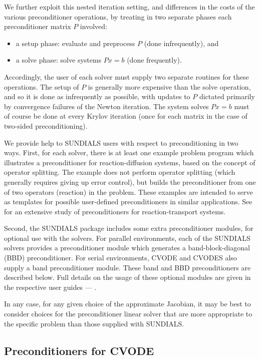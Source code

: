 We further exploit this nested iteration setting, and differences in
the costs of the various preconditioner operations, by treating in two
separate phases each preconditioner matrix $P$ involved:
\begin{itemize}
\item a setup phase: evaluate and preprocess $P$ (done infrequently), and
\item a solve phase: solve systems $Px = b$ (done frequently).
\end{itemize}
Accordingly, the user of each solver must supply two separate
routines for these operations.  The setup of $P$ is generally more
expensive than the solve operation, and so it is done as infrequently
as possible, with updates to $P$ dictated primarily by convergence
failures of the Newton iteration.  The system solves $Px = b$ must of
course be done at every Krylov iteration (once for each matrix in
the case of two-sided preconditioning).

We provide help to SUNDIALS users with respect to preconditioning in
two ways.  First, for each solver, there is at least one example
problem program which illustrates a preconditioner for
reaction-diffusion systems, based on the concept of operator
splitting.  The example does not perform operator splitting (which
generally requires giving up error control), but builds the
preconditioner from one of two operators (reaction) in the problem.
These examples are intended to serve as templates for possible
user-defined preconditioners in similar applications.  See
\cite{BrHi:89} for an extensive study of preconditioners for
reaction-transport systems.

Second, the SUNDIALS package includes some extra preconditioner
modules, for optional use with the solvers.  For parallel environments,
each of the SUNDIALS solvers provides a preconditioner module which
generates a band-block-diagonal (BBD) preconditioner.  For serial
environments, CVODE and CVODES also supply a band preconditioner module.  
These band and BBD preconditioners are described below.  Full details on the
usage of these optional modules are given in the respective user
guides --- \cite{HiSe:04cvode,HiSe:04cvodes,HSW:04kinsol,HiSe:04ida}.

In any case, for any given choice of the approximate Jacobian, it may
be best to consider choices for the preconditioner linear solver that
are more appropriate to the specific problem than those supplied with
SUNDIALS.

\subsection{Preconditioners for CVODE}

